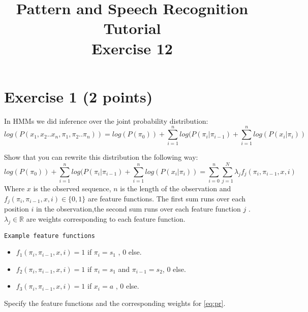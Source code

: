 \documentclass[a4paper,12pt]{article}
\title{Pattern and Speech Recognition Tutorial\\
Exercise 12 }
\date{}
\begin{document}
   \maketitle
   \thispagestyle{empty}

\maketitle


\section*{\bf Exercise 1 (2 points)} 
In HMMs we did inference over the joint probability distribution: \\
\begin{equation}
log (P(x_{1},x_{2}..x_{n}, \pi_{1}, \pi_{2}.. \pi_{n})) = log(P(\pi_{0})) + \sum_{i=1}^{n} log(P(\pi_{i} | \pi_{i-1}) + \sum_{i=1}^{n} log(P(x_{i} | \pi_{i}))
\end{equation} 

Show that you can rewrite this distribution the following way: \\
\begin{equation}
\label{eq:pr}
log(P(\pi_{0})) + \sum_{i=1}^{n} log(P(\pi_{i} | \pi_{i-1}) + \sum_{i=1}^{n} log(P(x_{i} | \pi_{i})) = \sum_{i=0}^{n} \sum_{j=1}^{N} \lambda_{j} f_{j}(\pi_{i},\pi_{i-1}, x, i)
\end{equation}
Where $x$ is the observed sequence, $n$ is the length of the observation and $f_{j}(\pi_{i},\pi_{i-1}, x, i) \in \lbrace 0,1 \rbrace $ are feature functions. The first sum runs over each position $i$ in the observation,the second sum runs over each feature function $j$ . $\lambda_{j} \in \mathbb{R}$ are weights corresponding to each feature function.\\
\begin{verbatim}
Example feature functions
\end{verbatim}
\begin{itemize}
\item $f_{1}(\pi_{i},\pi_{i-1}, x, i)= 1$ if $\pi_{i} = s_{1}$ , $0 $  else.
\item $f_{2}(\pi_{i},\pi_{i-1}, x, i)= 1$ if $\pi_{i} = s_{1}$ and $\pi_{i-1} = s_{2}$, $0 $  else.
\item $f_{3}(\pi_{i},\pi_{i-1}, x, i)= 1$ if $x_{i} = a$ , $0 $  else.
\end{itemize}

Specify the feature functions and the corresponding weights for \ref{eq:pr}.
\end{document}
